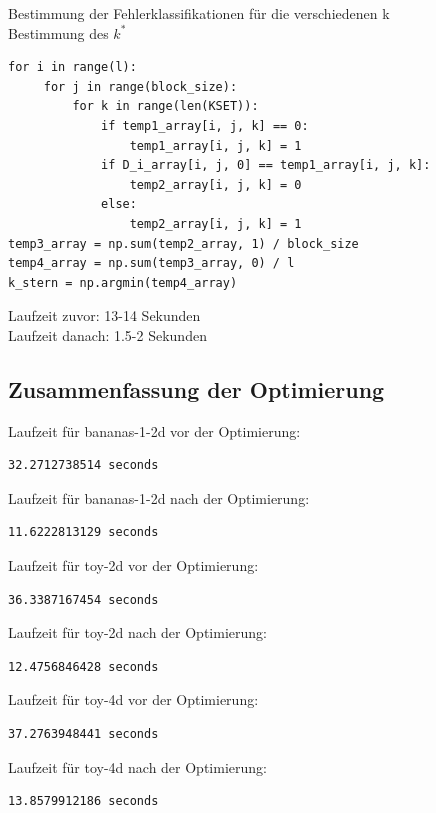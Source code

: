 \documentclass{beamer}
\begin{document}
\begin{frame}[fragile]
Bestimmung der Fehlerklassifikationen für die verschiedenen k\\
Bestimmung des $k^*$
\begin{verbatim}
for i in range(l):
     for j in range(block_size):
         for k in range(len(KSET)):
             if temp1_array[i, j, k] == 0:
                 temp1_array[i, j, k] = 1
             if D_i_array[i, j, 0] == temp1_array[i, j, k]:
                 temp2_array[i, j, k] = 0
             else:
                 temp2_array[i, j, k] = 1
temp3_array = np.sum(temp2_array, 1) / block_size
temp4_array = np.sum(temp3_array, 0) / l
k_stern = np.argmin(temp4_array)
\end{verbatim}
Laufzeit zuvor: 13-14 Sekunden\\
Laufzeit danach: 1.5-2 Sekunden
\end{frame}

\subsection{Zusammenfassung der Optimierung}
\begin{frame}[fragile]
Laufzeit für bananas-1-2d vor der Optimierung:
\begin{verbatim}
32.2712738514 seconds
\end{verbatim}
Laufzeit für bananas-1-2d nach der Optimierung:
\begin{verbatim}
11.6222813129 seconds
\end{verbatim}
\end{frame}

\begin{frame}[fragile]
Laufzeit für toy-2d vor der Optimierung:
\begin{verbatim}
36.3387167454 seconds
\end{verbatim}
Laufzeit für toy-2d nach der Optimierung:
\begin{verbatim}
12.4756846428 seconds
\end{verbatim}
\end{frame}

\begin{frame}[fragile]
Laufzeit für toy-4d vor der Optimierung:
\begin{verbatim}
37.2763948441 seconds
\end{verbatim}
Laufzeit für toy-4d nach der Optimierung:
\begin{verbatim}
13.8579912186 seconds
\end{verbatim}
\end{frame}
\end{document}
